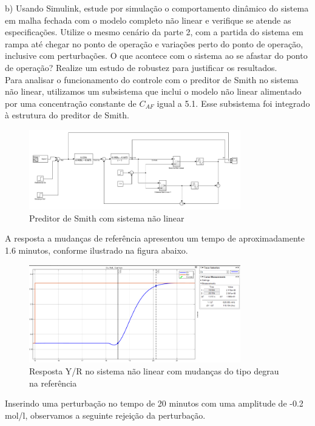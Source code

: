 \documentclass[a4paper,12pt]{article}
\begin{document}
b) Usando Simulink, estude por simulação o comportamento dinâmico do sistema em malha fechada com o modelo completo não linear e verifique se atende as especificações. Utilize o mesmo cenário da parte 2, com a partida do sistema em rampa até chegar no ponto de operação e variações perto do ponto de operação, inclusive com perturbações. O que acontece com o sistema ao se afastar do ponto de operação? Realize um estudo de robustez para justificar os resultados.\\

Para analisar o funcionamento do controle com o preditor de Smith no sistema não linear, utilizamos um subsistema que inclui o modelo não linear alimentado por uma concentração constante de \(C_{AF}\) igual a 5.1. Esse subsistema foi integrado à estrutura do preditor de Smith.

\begin{figure}[H]
  \centering
  \includegraphics[width=0.82\textwidth]{figure5.png}
  \caption{Preditor de Smith com sistema não linear}
  \end{figure}

A resposta a mudanças de referência apresentou um tempo de aproximadamente 1.6 minutos, conforme ilustrado na figura abaixo.

\begin{figure}[H]
  \centering
  \includegraphics[width=0.82\textwidth]{figure6.png}
  \caption{Resposta Y/R no sistema não linear com mudanças do tipo degrau na referência}
  \end{figure}

Inserindo uma perturbação no tempo de 20 minutos com uma amplitude de -0.2 mol/l, observamos a seguinte rejeição da perturbação.
\end{document}
